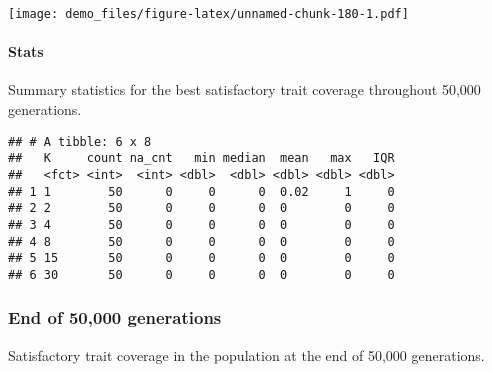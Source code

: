 \documentclass[]{book}
\newenvironment{Shaded}{\begin{snugshade}}{\end{snugshade}}
\newcommand{\DataTypeTok}[1]{\textcolor[rgb]{0.13,0.29,0.53}{#1}}
\newcommand{\KeywordTok}[1]{\textcolor[rgb]{0.13,0.29,0.53}{\textbf{#1}}}
\newcommand{\NormalTok}[1]{#1}
\newcommand{\OperatorTok}[1]{\textcolor[rgb]{0.81,0.36,0.00}{\textbf{#1}}}
\newcommand{\OtherTok}[1]{\textcolor[rgb]{0.56,0.35,0.01}{#1}}
\newcommand{\StringTok}[1]{\textcolor[rgb]{0.31,0.60,0.02}{#1}}
\let\oldparagraph\paragraph
\renewcommand{\paragraph}[1]{\oldparagraph{#1}\mbox{}}
\begin{document}
\texttt{[image: demo\_files/figure-latex/unnamed-chunk-180-1.pdf]}

\hypertarget{stats-79}{%
\paragraph{Stats}\label{stats-79}}

Summary statistics for the best satisfactory trait coverage throughout 50,000 generations.

\begin{Shaded}
\end{Shaded}

\begin{verbatim}
## # A tibble: 6 x 8
##   K     count na_cnt   min median  mean   max   IQR
##   <fct> <int>  <int> <dbl>  <dbl> <dbl> <dbl> <dbl>
## 1 1        50      0     0      0  0.02     1     0
## 2 2        50      0     0      0  0        0     0
## 3 4        50      0     0      0  0        0     0
## 4 8        50      0     0      0  0        0     0
## 5 15       50      0     0      0  0        0     0
## 6 30       50      0     0      0  0        0     0
\end{verbatim}

\hypertarget{end-of-50000-generations-38}{%
\subsubsection{End of 50,000 generations}\label{end-of-50000-generations-38}}

Satisfactory trait coverage in the population at the end of 50,000 generations.
\end{document}
